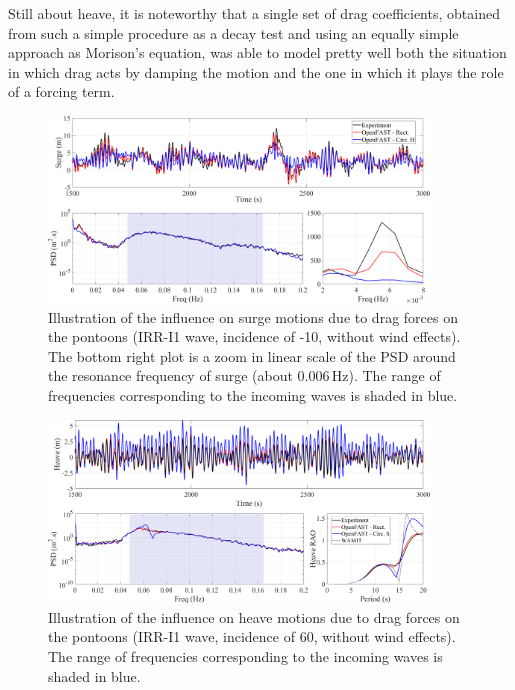Still about heave, it is noteworthy that a single set of drag coefficients, obtained from such a simple procedure as a decay test and using an equally simple approach as Morison's equation, was able to model pretty well both the situation in which drag acts by damping the motion and the one in which it plays the role of a forcing term.
\begin{figure}[!hbtp]
	\centering
	\includegraphics[width=0.9\textwidth]{./figures/ptfmsurge-drag_pontoon.png}	
	\caption{Illustration of the influence on surge motions due to drag forces on the pontoons (IRR-I1 wave, incidence of -10\textdegree{}, without wind effects). The bottom right plot is a zoom in linear scale of the PSD around the resonance frequency of surge (about $0.006\,\text{Hz}$). The range of frequencies corresponding to the incoming waves is shaded in blue.} \label{fig:exp_vs_num:drag:ptfmsurge}
\end{figure}

\begin{figure}[!hbtp]
	\centering
	\includegraphics[width=0.9\textwidth]{./figures/ptfmheave-drag_pontoon.png}	
	\caption{Illustration of the influence on heave motions due to drag forces on the pontoons (IRR-I1 wave, incidence of 60\textdegree{}, without wind effects). The range of frequencies corresponding to the incoming waves is shaded in blue.} \label{fig:exp_vs_num:drag:ptfmheave}%
\end{figure}%












